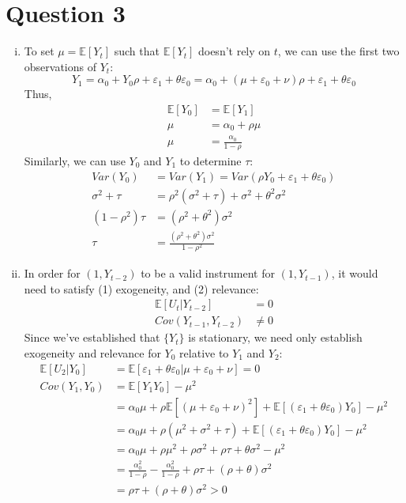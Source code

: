 \documentclass{article}
\newcommand{\E}[1]{\mathbb{E}\left[#1\right]}%
\begin{document}

\section*{Question 3}

\begin{enumerate}[(i)]
	\item To set ${\mu=\E{Y_t}}$ such that $\E{Y_t}$ doesn't rely on $t$, we can use the first two observations of $Y_t$:
		\[
			Y_1 = \alpha_0 + Y_0\rho + \varepsilon_1 + \theta\varepsilon_0 = \alpha_0 + (\mu + \varepsilon_0 + \nu)\rho + \varepsilon_1 + \theta\varepsilon_0
		\]
		Thus,
		\begin{align*}
			\E{Y_0} &= \E{Y_1} 					\\
			\mu		&= \alpha_0 + \rho\mu		\\
			\mu 	&= \frac{\alpha_0}{1-\rho}
		\end{align*}
		Similarly, we can use $Y_0$ and $Y_1$ to determine $\tau$:
		\begin{align*}
			Var(Y_0) 		&= Var(Y_1) = Var(\rho Y_0 + \varepsilon_1 + \theta\varepsilon_0)	\\
			\sigma^2 + \tau &= \rho^2(\sigma^2 + \tau) + \sigma^2 + \theta^2\sigma^2			\\
			(1-\rho^2)\tau 	&= (\rho^2 + \theta^2)\sigma^2										\\
					\tau	&= \frac{(\rho^2 + \theta^2)\sigma^2}{1-\rho^2}
		\end{align*}
	
	\item In order for $(1,Y_{t-2})$ to be a valid instrument for $(1,Y_{t-1})$, it would need to satisfy (1) exogeneity, and (2) relevance:
		\begin{align}
			\E{U_t|Y_{t-2}} 		&= 		0	\\
			Cov(Y_{t-1},Y_{t-2}) 	&\neq	0
		\end{align}
		Since we've established that $\{Y_t\}$ is stationary, we need only establish exogeneity and relevance for $Y_0$ relative to $Y_1$ and $Y_2$:
		\begin{align*}
			\E{U_2|Y_{0}} 	&= \E{\varepsilon_1 + \theta\varepsilon_0|\mu + \varepsilon_0 + \nu} = 0										\\
			Cov(Y_1,Y_0)	&= \E{Y_1Y_0} - \mu^2 \\
							&= \alpha_0\mu + \rho\E{(\mu + \varepsilon_0 + \nu)^2} + \E{(\varepsilon_1 + \theta\varepsilon_0)Y_0} - \mu^2	\\
							&= \alpha_0\mu + \rho(\mu^2 + \sigma^2 + \tau) + \E{(\varepsilon_1 + \theta\varepsilon_0)Y_0} - \mu^2			\\
							&= \alpha_0\mu + \rho\mu^2 + \rho\sigma^2 + \rho\tau + \theta\sigma^2 - \mu^2									\\
							&= \frac{\alpha_0^2}{1-\rho} - \frac{\alpha_0^2}{1-\rho} + \rho\tau + (\rho + \theta)\sigma^2					\\
							&= \rho\tau + (\rho + \theta)\sigma^2 > 0
		\end{align*}

	
\end{enumerate}



\end{document}
